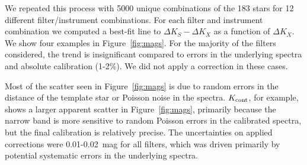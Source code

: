 \documentclass[twocolumn]{aastex62}
\begin{document}
We repeated this process with 5000 unique combinations of the 183 stars for 12 different filter/instrument combinations. For each filter and instrument combination we computed a best-fit line to $\Delta K_S -\Delta K_X$ as a function of $\Delta K_X$. We show four examples in Figure~\ref{fig:mags}. For the majority of the filters considered, the trend is insignificant compared to errors in the underlying spectra and absolute calibration (1-2\%). We did not apply a correction in these cases. 

Most of the scatter seen in Figure~\ref{fig:mags} is due to random errors in the distance of the template star or Poisson noise in the spectra. $K_{\rm{cont}}$, for example, shows a larger apparent scatter in Figure~\ref{fig:mags}, primarily because the narrow band is more sensitive to random Poisson errors in the calibrated spectra, but the final calibration is relatively precise. The uncertainties on applied corrections were 0.01-0.02~mag for all filters, which was driven primarily by potential systematic errors in the underlying spectra. 
\end{document}
